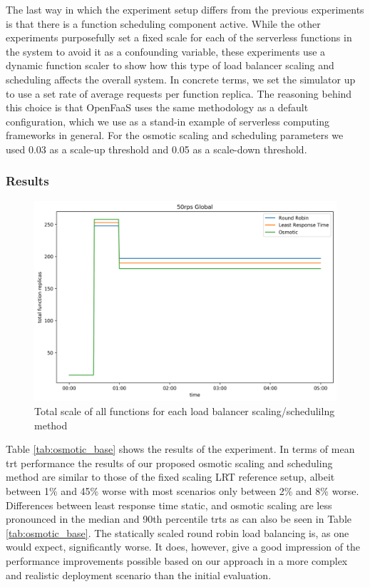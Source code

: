 The last way in which the experiment setup differs from the previous experiments is that there is a function scheduling component active. While the other experiments purposefully set a fixed scale for each of the serverless functions in the system to avoid it as a confounding variable, these experiments use a dynamic function scaler to show how this type of load balancer scaling and scheduling affects the overall system.
In concrete terms, we set the simulator up to use a set rate of average requests per function replica.
The reasoning behind this choice is that OpenFaaS uses the same methodology as a default configuration, which we use as a stand-in example of serverless computing frameworks in general.
For the osmotic scaling and scheduling parameters we used 0.03 as a scale-up threshold and 0.05 as a scale-down threshold.

\subsubsection{Results}



\begin{figure}
    \centering
    \includegraphics[width=12cm]{graphics/graphs/osmotic_base_function_scale_by_lb.png}
    \caption{Total scale of all functions for each load balancer scaling/schedulilng method}
    \label{fig:osmotic_fx_scale_by_scaling}
\end{figure}

Table \ref{tab:osmotic_base} shows the results of the experiment.
In terms of mean \gls{trt} performance the results of our proposed osmotic scaling and scheduling method are similar to those of the fixed scaling LRT reference setup, albeit between 1\% and 45\% worse with most scenarios only between 2\% and 8\% worse.
Differences between least response time static, and osmotic scaling are less pronounced in the median and 90th percentile \glspl{trt} as can also be seen in Table \ref{tab:osmotic_base}.
The statically scaled round robin load balancing is, as one would expect, significantly worse.
It does, however, give a good impression of the performance improvements possible based on our approach in a more complex and realistic deployment scenario than the initial evaluation.


